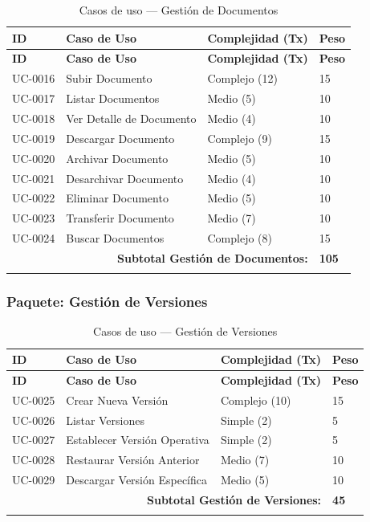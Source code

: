 \documentclass[11pt, a4paper]{article}
\begin{document}
\begin{longtable}{|p{1.8cm}|p{6.5cm}|p{3cm}|p{1.5cm}|}
\hline
\textbf{ID} & \textbf{Caso de Uso} & \textbf{Complejidad (Tx)} & \textbf{Peso} \\
\hline
\endfirsthead
\hline
\textbf{ID} & \textbf{Caso de Uso} & \textbf{Complejidad (Tx)} & \textbf{Peso} \\
\hline
\endhead
UC-0016 & Subir Documento & Complejo (12) & 15 \\
\hline
UC-0017 & Listar Documentos & Medio (5) & 10 \\
\hline
UC-0018 & Ver Detalle de Documento & Medio (4) & 10 \\
\hline
UC-0019 & Descargar Documento & Complejo (9) & 15 \\
\hline
UC-0020 & Archivar Documento & Medio (5) & 10 \\
\hline
UC-0021 & Desarchivar Documento & Medio (4) & 10 \\
\hline
UC-0022 & Eliminar Documento & Medio (5) & 10 \\
\hline
UC-0023 & Transferir Documento & Medio (7) & 10 \\
\hline
UC-0024 & Buscar Documentos & Complejo (8) & 15 \\
\hline
\multicolumn{3}{|r|}{\textbf{Subtotal Gestión de Documentos:}} & \textbf{105} \\
\hline
\caption{Casos de uso --- Gestión de Documentos}
\end{longtable}

\subsubsection*{Paquete: Gestión de Versiones}

\begin{longtable}{|p{1.8cm}|p{6.5cm}|p{3cm}|p{1.5cm}|}
\hline
\textbf{ID} & \textbf{Caso de Uso} & \textbf{Complejidad (Tx)} & \textbf{Peso} \\
\hline
\endfirsthead
\hline
\textbf{ID} & \textbf{Caso de Uso} & \textbf{Complejidad (Tx)} & \textbf{Peso} \\
\hline
\endhead
UC-0025 & Crear Nueva Versión & Complejo (10) & 15 \\
\hline
UC-0026 & Listar Versiones & Simple (2) & 5 \\
\hline
UC-0027 & Establecer Versión Operativa & Simple (2) & 5 \\
\hline
UC-0028 & Restaurar Versión Anterior & Medio (7) & 10 \\
\hline
UC-0029 & Descargar Versión Específica & Medio (5) & 10 \\
\hline
\multicolumn{3}{|r|}{\textbf{Subtotal Gestión de Versiones:}} & \textbf{45} \\
\hline
\caption{Casos de uso --- Gestión de Versiones}
\end{longtable}
\end{document}
